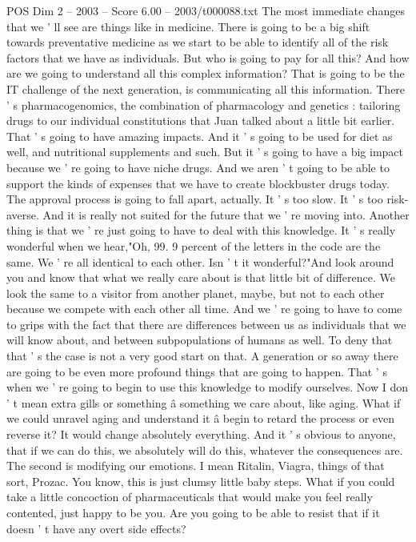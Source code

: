 \begin{textsample}{POS Dim 2 – 2003 – Score 6.00 – 2003/t000088.txt}
The most immediate changes that we ' ll see are things like in medicine.
There is going to be a big shift towards preventative medicine as we start to be able to identify all of the risk factors that we have as individuals.
But who is going to pay for all this?
And how are we going to understand all this complex information?
That is going to be the IT challenge of the next generation, is communicating all this information.
There ' s pharmacogenomics, the combination of pharmacology and genetics : tailoring drugs to our individual constitutions that Juan talked about a little bit earlier.
That ' s going to have amazing impacts.
And it ' s going to be used for diet as well, and nutritional supplements and such.
But it ' s going to have a big impact because we ' re going to have niche drugs.
And we aren ' t going to be able to support the kinds of expenses that we have to create blockbuster drugs today.
The approval process is going to fall apart, actually.
It ' s too slow.
It ' s too risk-averse.
And it is really not suited for the future that we ' re moving into.
Another thing is that we ' re just going to have to deal with this knowledge.
It ' s really wonderful when we hear,"Oh, 99. 9 percent of the letters in the code are the same.
We ' re all identical to each other.
Isn ' t it wonderful?"And look around you and know that what we really care about is that little bit of difference.
We look the same to a visitor from another planet, maybe, but not to each other because we compete with each other all time.
And we ' re going to have to come to grips with the fact that there are differences between us as individuals that we will know about, and between subpopulations of humans as well.
To deny that that ' s the case is not a very good start on that.
A generation or so away there are going to be even more profound things that are going to happen.
That ' s when we ' re going to begin to use this knowledge to modify ourselves.
Now I don ' t mean extra gills or something â something we care about, like aging.
What if we could unravel aging and understand it â begin to retard the process or even reverse it?
It would change absolutely everything.
And it ' s obvious to anyone, that if we can do this, we absolutely will do this, whatever the consequences are.
The second is modifying our emotions.
I mean Ritalin, Viagra, things of that sort, Prozac.
You know, this is just clumsy little baby steps.
What if you could take a little concoction of pharmaceuticals that would make you feel really contented, just happy to be you.
Are you going to be able to resist that if it doesn ' t have any overt side effects?

\end{textsample}
